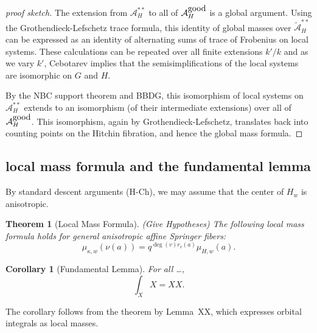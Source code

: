 \documentclass[brochure,english,12pt]{bourbaki}
\newtheorem{theorem}[equation]{Theorem}
\newtheorem{corollary}[equation]{Corollary}
\def\A{{\mathcal A}}
\def\tA{{\tilde{\mathcal A}}}
\begin{document}
\begin{proof}[proof sketch]
The extension from $\A_H^{**}$ to all of $\A_H^{\hbox{good}}$ is a
global argument.  Using the Grothendieck-Lefschetz trace formula, this
identity of global masses over $\tA_H^{**}$ can be expressed as an identity of alternating sums
of trace of Frobenius on local systems.  These calculations can be
repeated over all finite extensions $k'/k$ and as we vary $k'$,
Cebotarev implies that the semisimplifications of the local systems
are isomorphic on $G$ and $H$.

By the NBC support theorem and BBDG, this isomorphism of local systems
on $\A_H^{**}$ extends to an isomorphism (of their intermediate
extensions) over all of $\A_H^{\hbox{good}}$.  This isomorphism, again
by Grothendieck-Lefschetz, translates back into counting points on the
Hitchin fibration, and hence the global mass formula.
\end{proof}


\subsection{local mass formula and the fundamental lemma}


By standard descent arguments (H-Ch), we may assume that the
center of $H_w$ is anisotropic.


\begin{theorem}[Local Mass Formula]  (Give Hypotheses)
The following local mass formula holds for general anisotropic affine Springer fibers:
\[
\mu_{\kappa,w}(\nu(a)) = q^{\deg(v) r_v(a)}\mu_{H,w}(a).
\]
\end{theorem}

\begin{corollary}[Fundamental Lemma] For all \dots,
$$\int_XX = XX.$$
\end{corollary}

The corollary follows from the theorem by Lemma~XX, which expresses orbital integrals
as local masses.
\end{document}
